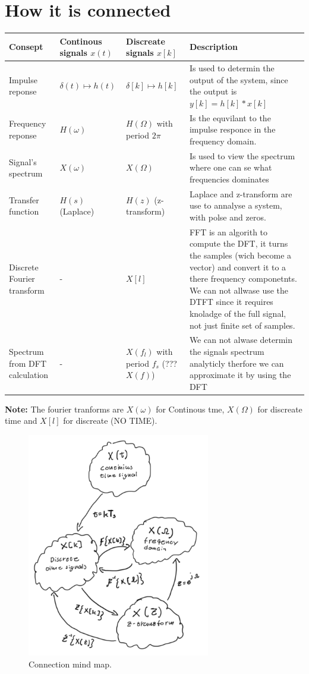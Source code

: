 

\newpage
\section{How it is connected}
\begin{tabular}{|m{2cm}|m{3cm}|m{4cm}|m{6cm}|}
    \hline
    Consept & Continous signals $x(t)$ & Discreate signals $x[k]$ & Description \\
    \hline
    \hline
    Impulse reponse & $\delta(t) \mapsto h(t)$ & $\delta[k] \mapsto h[k]$ & Is used to determin the output of the system, since the output is $y[k]=h[k]*x[k]$ \\
    \hline
    Frequency reponse & $H(\omega)$ & $H(\Omega)$ with period $2\pi$ & Is the equvilant to the impulse responce in the frequency domain. \\
    \hline
    Signal's spectrum & $X(\omega)$ & $X(\Omega)$ & Is used to view the spectrum where one can se what frequencies dominates \\
    \hline
    Transfer function & $H(s)$ (Laplace) & $H(z)$ (z-transform) & Laplace and z-transform are use to annalyse a system, with polse and zeros. \\
    \hline
    Discrete Fourier transform & - & $X[l]$ & FFT is an algorith to compute the DFT, it turns the samples (wich become a vector) and convert it to a there frequency componetnts. We can not allwase use the DTFT since it requires knoladge of the full signal, not just finite set of samples. \\
    \hline
    Spectrum from DFT calculation & - & $X(f_l)$ with period $f_s$ (???$X(f)$) & We can not alwase determin the signals spectrum analyticly therfore we can approximate it by using the DFT \\
    \hline
\end{tabular}
\textbf{Note:} The fourier tranforms are $X(\omega)$ for Continous tme, $X(\Omega)$ for discreate time and 
$X[l]$ for discreate (NO TIME).  

\begin{figure}[!ht]
   \centering
   \includegraphics[width=8cm]{image/connection_mind-map.pdf} 
   \caption{Connection mind map.}
   \label{fig:connection_mind-map}
\end{figure}


